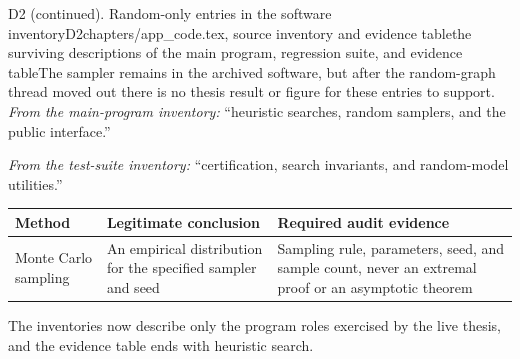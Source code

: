 \begin{offcutrewrite}{D2 (continued). Random-only entries in the software inventory}{D2}{chapters/app\_code.tex, source inventory and evidence table}{the surviving descriptions of the main program, regression suite, and evidence table}{The sampler remains in the archived software, but after the random-graph thread moved out there is no thesis result or figure for these entries to support.}
\emph{From the main-program inventory:} ``heuristic searches, random samplers, and the public  interface.''

\emph{From the test-suite inventory:} ``certification, search invariants, and random-model utilities.''

\begin{center}
\begin{tabularx}{\textwidth}{@{}>{\raggedright\arraybackslash}p{}>{\raggedright\arraybackslash}p{}>{\raggedright\arraybackslash}X@{}}
\toprule
Method & Legitimate conclusion & Required audit evidence \\
\midrule
Monte Carlo sampling & An empirical distribution for the specified sampler and seed & Sampling rule, parameters, seed, and sample count, never an extremal proof or an asymptotic theorem \\
\bottomrule
\end{tabularx}
\end{center}
\nowreads
The inventories now describe only the program roles exercised by the live thesis, and the evidence table ends with heuristic search.
\end{offcutrewrite}

